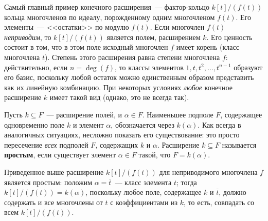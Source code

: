 \documentclass[a4paper,11pt]{scrartcl}
\theoremstyle{plain}
\theoremstyle{definition}
\newcommand\dfn[1]{\textbf{#1}}
\newcommand\sseq{\subseteq}
\begin{document}
Самый главный пример конечного расширения~--- фактор-кольцо
$k[t]/(f(t))$ кольца многочленов по идеалу, порожденному одним
многочленом $f(t)$. Его элементы~--- <<остатки>> по модулю $f(t)$.
Если многочлен $f(t)$ \emph{неприводим}, то $k[t]/(f(t))$ является
полем, расширением $k$. Его ценность состоит в том, что в этом поле
исходный многочлен $f$ имеет корень (класс многочлена $t$). Степень
этого расширения равна степени многочлена $f$: действительно, если
$n=\deg(f)$, то классы элементов $1,t,t^2,\dots,t^{n-1}$ образуют его
базис, поскольку любой остаток можно единственным образом представить
как их линейную комбинацию.
При некоторых условиях \emph{любое} конечное расширение $k$ имеет такой
вид (однако, это не всегда так).


Пусть $k\sseq F$~--- расширение полей, и $\alpha\in F$. Наименьшее
подполе $F$, содержащее одновременно поле $k$ и элемент $\alpha$,
обозначается через $k(\alpha)$. Как всегда в аналогичных ситуациях,
несложно показать его существование: это просто пересечение \emph{всех}
подполей $F$, содержащих $k$ и $\alpha$. Расширение $k\sseq F$
называется \dfn{простым}, если существует элемент $\alpha\in F$ такой,
что $F=k(\alpha)$.

Приведенное выше расширение $k[t]/(f(t))$ для неприводимого многочлена
$f$ является простым: положим $\alpha=\overline{t}$~--- класс элемента
$t$; тогда $k[t]/(f(t))=k(\alpha)$, поскольку любое поле, содержащее
$k$ и $\overline{t}$, должно содержать и все многочлены от $t$ с
коэффициентами из $k$, то есть, совпадать со всем
$k[t]/(f(t))$.
\end{document}
